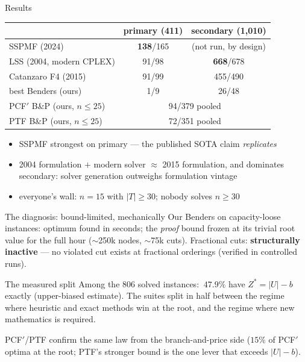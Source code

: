 \documentclass[10pt]{beamer}
\newcommand{\U}{U}\newcommand{\Kst}{K^{\ast}}\newcommand{\Zst}{Z^{\ast}}
\begin{document}
\begin{frame}{Results}
\begin{center}
\begin{tabular}{lcc}
\toprule
 & primary (411) & secondary (1{,}010)\\
\midrule
SSPMF (2024)            & \textbf{138}/165 & (not run, by design)\\
LSS (2004, modern CPLEX)& 91/98            & \textbf{668}/678\\
Catanzaro F4 (2015)     & 91/99            & 455/490\\
best Benders (ours)     & 1/9              & 26/48\\
PCF$'$ B\&P (ours, $n\le25$) & \multicolumn{2}{c}{94/379 pooled}\\
PTF B\&P (ours, $n\le25$)    & \multicolumn{2}{c}{72/351 pooled}\\
\bottomrule
\end{tabular}
\end{center}
\vspace{1mm}
\pause
\begin{itemize}
  \item SSPMF strongest on primary --- the published SOTA claim \emph{replicates}
  \item 2004 formulation $+$ modern solver $\approx$ 2015 formulation, and
        dominates secondary: solver generation outweighs formulation vintage
  \item everyone's wall: $n=15$ with $|T|\ge30$; nobody solves $n\ge30$
\end{itemize}
\end{frame}

\begin{frame}{The diagnosis: bound-limited, mechanically}
Our Benders on capacity-loose instances: optimum found in seconds; the
\emph{proof} bound frozen at its trivial root value for the full hour
($\sim$250k nodes, $\sim$75k cuts). Fractional cuts: \textbf{structurally
inactive} --- no violated cut exists at fractional orderings (verified in
controlled runs).
\vspace{2mm}
\begin{block}{The measured split}
Among the $806$ solved instances: $\ 47.9\%$ have $\Zst=|\U|-b$ exactly
(upper-biased estimate). The suites split in half between the regime where
heuristic and exact methods win at the root, and the regime where new
mathematics is required.
\end{block}
PCF$'$/PTF confirm the same law from the branch-and-price side
($15\%$ of PCF$'$ optima at the root; PTF's stronger bound is the one lever
that exceeds $|\U|-b$).
\end{frame}
\end{document}
